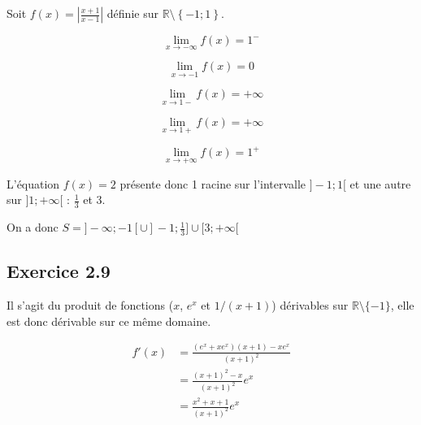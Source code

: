 \documentclass{report}
\begin{document}
Soit $f(x) = \left| \frac{x+1}{x-1} \right|$ définie sur $\mathbb{R} \setminus \left\lbrace -1 ; 1 \right\rbrace$.

\begin{displaymath}
	\lim_{x \rightarrow -\infty} f(x) = 1^{-}
\end{displaymath}

\begin{displaymath}
	\lim_{x \rightarrow -1} f(x) = 0
\end{displaymath}

\begin{displaymath}
	\lim_{x \rightarrow 1-} f(x) = +\infty
\end{displaymath}

\begin{displaymath}
	\lim_{x \rightarrow 1+} f(x) = +\infty
\end{displaymath}

\begin{displaymath}
	\lim_{x \rightarrow +\infty} f(x) = 1^{+}
\end{displaymath}


L'équation $f(x)=2$ présente donc 1 racine sur l'intervalle $]-1 ; 1[$ et une autre sur $]1; +\infty[$ : $\frac{1}{3}$ et $3$.

On a donc $S = ]-\infty ; -1[ \cup ]-1 ; \frac{1}{3}] \cup [3 ; +\infty[$

\subsection*{Exercice 2.9}

Il s'agit du produit de fonctions ($x$, $e^x$ et $1/(x+1)$) dérivables sur $\mathbb{R}\setminus\{-1\}$,
elle est donc dérivable sur ce même domaine. 

\begin{equation*}
	\begin{split}
		f'(x) &= \frac{(e^x + x e^x)(x+1)-x e^x}{(x+1)^2} \\
		      &= \frac{(x+1)^2-x}{(x+1)^2}e^x \\
		      &= \frac{x^2 + x + 1}{(x+1)^2}e^x
	\end{split}
\end{equation*}
\end{document}
